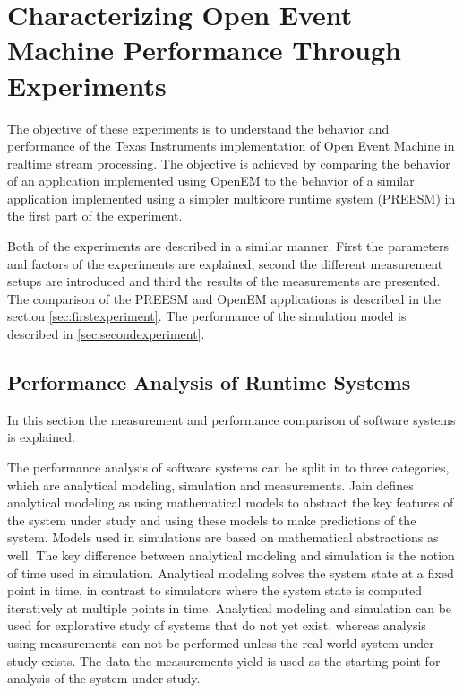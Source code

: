 \chapter [OpenEM Experiments] {Characterizing Open Event Machine Performance
Through Experiments}
\label{chapter:experiments}
The objective of these experiments is to understand the behavior and
performance of the Texas Instruments implementation of Open Event Machine in
realtime stream processing. The objective is achieved by comparing the behavior
of an application implemented using OpenEM to the behavior of a similar
application implemented using a simpler multicore runtime system (PREESM) in the
first part of the experiment. 

Both of the experiments are described in a similar manner. First the parameters
and factors of the experiments are explained, second the different measurement
setups are introduced and third the results of the measurements are presented.
The comparison of the PREESM and OpenEM applications is described in the section
\ref{sec:firstexperiment}. The performance of the simulation model is described
in \ref{sec:secondexperiment}.


\section{Performance Analysis of Runtime Systems}
\label{sec:perfanalysis}
In this section the measurement and performance comparison of software systems
is explained.

The performance analysis of software systems can be split in to three
categories, which are analytical modeling, simulation and measurements. Jain
\cite{jain1991art} defines analytical modeling as using mathematical models to
abstract the key features of the system under study and using these models to
make predictions of the system. Models used in simulations are based on
mathematical abstractions as well. The key difference between analytical
modeling and simulation is the notion of time used in simulation. Analytical
modeling solves the system state at a fixed point in time, in contrast to
simulators where the system state is computed iteratively at multiple points in
time. Analytical modeling and simulation can be used for explorative study of
systems that do not yet exist, whereas analysis using measurements can not be
performed unless the real world system under study exists. The data the
measurements yield is used as the starting point for analysis of the system
under study. \cite{jain1991art}

